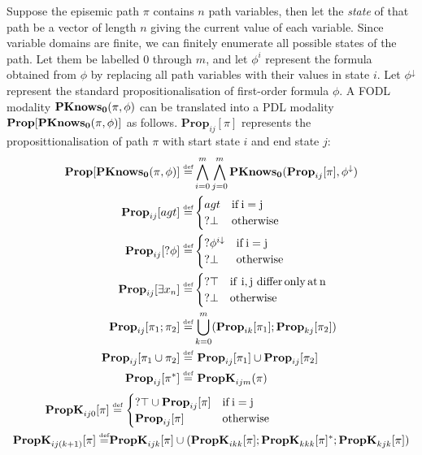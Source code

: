 Suppose the episemic path $\pi$ contains $n$ path variables, then
let the \emph{state} of that path be a vector of length $n$ giving
the current value of each variable. Since variable domains are finite,
we can finitely enumerate all possible states of the path. Let them
be labelled $0$ through $m$, and let $\phi^{i}$ represent the formula
obtained from $\phi$ by replacing all path variables with their values
in state $i$. Let $\phi^{\downarrow}$ represent the standard propositionalisation
of first-order formula $\phi$. A FODL modality $\mathbf{PKnows_{0}}(\pi,\phi)$
can be translated into a PDL modality $\mathbf{Prop}[\mathbf{PKnows_{0}}(\pi,\phi)]$
as follows. $\mathbf{Prop}_{ij}[\pi]$ represents the proposittionalisation
of path $\pi$ with start state $i$ and end state $j$:\begin{align*}
\mathbf{Prop}[\mathbf{PKnows_{0}}(\pi,\phi)]\stackrel{\mbox{\tiny def}}{=} & \bigwedge_{i=0}^{m}\bigwedge_{j=0}^{m}\mathbf{PKnows_{0}}(\mathbf{Prop}_{ij}[\pi],\phi^{\downarrow})\\
\mathbf{Prop}_{ij}[agt]\stackrel{\mbox{\tiny def}}{=} & \begin{cases}
agt & \mathrm{if\, i=j}\\
?\bot & \mathrm{otherwise}\end{cases}\\
\mathbf{Prop}_{ij}[?\phi]\stackrel{\mbox{\tiny def}}{=} & \begin{cases}
?\phi^{i\downarrow} & \mathrm{if\, i=j}\\
?\bot & \mathrm{otherwise}\end{cases}\\
\mathbf{Prop}_{ij}[\exists x_{n}]\stackrel{\mbox{\tiny def}}{=} & \begin{cases}
?\top & \mathrm{if\,\, i,j\,\, differ\, only\, at\, n}\\
?\bot & \mathrm{otherwise}\end{cases}\\
\mathbf{Prop}_{ij}[\pi_{1};\pi_{2}]\stackrel{\mbox{\tiny def}}{=} & \bigcup_{k=0}^{m}(\mathbf{Prop}_{ik}[\pi_{1}];\mathbf{Prop}_{kj}[\pi_{2}])\\
\mathbf{Prop}_{ij}[\pi_{1}\cup\pi_{2}]\stackrel{\mbox{\tiny def}}{=} & \,\,\mathbf{Prop}_{ij}[\pi_{1}]\cup\mathbf{Prop}_{ij}[\pi_{2}]\\
\mathbf{Prop}_{ij}[\pi^{*}]\stackrel{\mbox{\tiny def}}{=} & \,\,\mathbf{PropK}_{ijm}(\pi)\end{align*}
 \begin{align*}
\mathbf{PropK}_{ij0}[\pi] & \stackrel{\mbox{\tiny def}}{=}\begin{cases}
?\top\cup\mathbf{Prop}_{ij}[\pi] & \mathrm{if\, i=j}\\
\mathbf{Prop}_{ij}[\pi] & \mathrm{otherwise}\end{cases}\\
\mathbf{PropK}_{ij(k+1)}[\pi]\stackrel{\mbox{\tiny def}}{=} & \mathbf{PropK}_{ijk}[\pi]\cup(\mathbf{PropK}_{ikk}[\pi];\mathbf{PropK}_{kkk}[\pi]^{*};\mathbf{PropK}_{kjk}[\pi])\end{align*}


